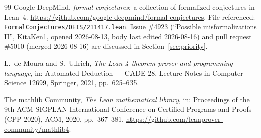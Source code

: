 \documentclass[11pt]{article}
\theoremstyle{plain}
\theoremstyle{definition}
\theoremstyle{remark}
\numberwithin{equation}{section}
\begin{document}
\begin{thebibliography}{99}
Google DeepMind, \emph{formal-conjectures}: a collection of formalized conjectures in Lean~4.
\url{https://github.com/google-deepmind/formal-conjectures}. File referenced:
\texttt{FormalConjectures/OEIS/211417.lean}. Issue \#4923 (``Possible misformalizations II'',
KitaKen1, opened 2026-08-13, body last edited 2026-08-16) and pull request \#5010 (merged
2026-08-16) are discussed in Section~\ref{sec:priority}.

L.~de Moura and S.~Ullrich, \emph{The Lean 4 theorem prover and programming language},
in: Automated Deduction --- CADE 28, Lecture Notes in Computer Science 12699, Springer, 2021,
pp.~625--635.

The mathlib Community, \emph{The Lean mathematical library},
in: Proceedings of the 9th ACM SIGPLAN International Conference on Certified Programs and Proofs
(CPP 2020), ACM, 2020, pp.~367--381.
\url{https://github.com/leanprover-community/mathlib4}.

\end{thebibliography}
\end{document}
